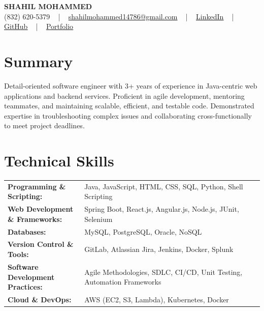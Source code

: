 \documentclass[letterpaper,11pt]{article}
\begin{document}
\begin{center}
    {\fontsize{14pt}{12pt}\selectfont \textbf{\MakeUppercase{Shahil Mohammed}}}\\ \vspace{2pt}
    \fontsize{10pt}{12pt}\selectfont (832) 620-5379 ~ | ~ \href{mailto:shahilmohammed14786@gmail.com}{shahilmohammed14786@gmail.com} ~ | ~  
    \href{https://www.linkedin.com/in/shahil-mohammed-9652931a1/}{\color{blue}\underline{LinkedIn}}  ~ | ~ 
    \href{https://github.com/freakbeast14}{\color{blue}\underline{GitHub}} ~ | ~ 
    \href{https://shahil-mohammed.netlify.app/}{\color{blue}\underline{Portfolio}}
    \vspace{-8pt}
\end{center}

\section{Summary}
\fontsize{9pt}{10pt}\selectfont
Detail-oriented software engineer with 3+ years of experience in Java-centric web applications and backend services. Proficient in agile development, mentoring teammates, and maintaining scalable, efficient, and testable code. Demonstrated expertise in troubleshooting complex issues and collaborating cross-functionally to meet project deadlines.
 \vspace{-5pt}
 
\section{Technical Skills}
        \vspace{-14pt}
        \begin{table}[h]
            \fontsize{9pt}{10pt}\selectfont
            \begin{tabular}{p{0.3\linewidth} p{0.7\linewidth}}
                \textbf{Programming \& Scripting:} & Java, JavaScript, HTML, CSS, SQL, Python, Shell Scripting \\
                \textbf{Web Development \& Frameworks:} & Spring Boot, React.js, Angular.js, Node.js, JUnit, Selenium \\
                \textbf{Databases:} & MySQL, PostgreSQL, Oracle, NoSQL \\
                \textbf{Version Control \& Tools:} & GitLab, Atlassian Jira, Jenkins, Docker, Splunk \\
                \textbf{Software Development Practices:} & Agile Methodologies, SDLC, CI/CD, Unit Testing, Automation Frameworks \\
                \textbf{Cloud \& DevOps:} & AWS (EC2, S3, Lambda), Kubernetes, Docker \\
            \end{tabular}
        \end{table}
 \vspace{-15pt}
 
\end{document}

